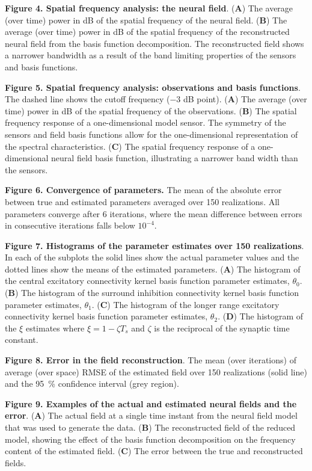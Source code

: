 \documentclass[5p,authoryear]{elsarticle}
\begin{document}
{\bf Figure 4. Spatial frequency analysis: the neural field}. (\textbf{A}) The average (over time) power in dB of the spatial frequency of the neural field. (\textbf{B}) The average (over time) power in dB of the spatial frequency of the reconstructed neural field from the basis function decomposition. The reconstructed field shows a narrower bandwidth as a result of the band limiting properties of the sensors and basis functions.

{\bf Figure 5. Spatial frequency analysis: observations and basis functions}. The dashed line shows the cutoff frequency ($-3$ dB point). (\textbf{A}) The average (over time) power in dB of the spatial frequency of the observations. (\textbf{B}) The spatial frequency response of a one-dimensional model sensor. The symmetry of the sensors and field basis functions allow for the one-dimensional representation of the spectral characteristics. (\textbf{C}) The spatial frequency response of a one-dimensional neural field basis function, illustrating a narrower band width than the sensors.

{\bf Figure 6. Convergence of parameters.} The mean of the absolute error between true and estimated parameters averaged over 150 realizations. All parameters converge after 6 iterations, where the mean difference between errors in consecutive iterations falls below $10^{-4}$.

{\bf Figure 7. Histograms of the parameter estimates over 150 realizations}. In  each of the subplots the solid lines show the actual parameter values and the dotted lines show the means of the estimated parameters. (\textbf{A}) The histogram of the central excitatory connectivity kernel basis function parameter estimates, $\theta_0$. (\textbf{B}) The histogram of the surround inhibition connectivity kernel basis function parameter estimates, $\theta_1$. (\textbf{C}) The histogram of the longer range excitatory connectivity kernel basis function parameter estimates, $\theta_2$. (\textbf{D}) The histogram of the $\xi$ estimates where $\xi=1-\zeta T_s $ and $\zeta$ is the reciprocal of the synaptic time constant.

{\bf Figure 8. Error in the field reconstruction}. The mean (over iterations) of average (over space) RMSE of the estimated field over 150 realizations (solid line) and the 95~\% confidence interval (grey region).

{\bf Figure 9. Examples of the actual and estimated neural fields and the error}. (\textbf{A}) The actual field at a single time instant from the neural field model that was used to generate the data. (\textbf{B}) The reconstructed field of the reduced model, showing the effect of the basis function decomposition on the frequency content of the estimated field. (\textbf{C}) The error between the true and reconstructed fields.
\end{document}
